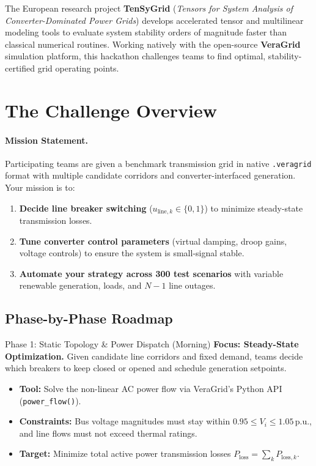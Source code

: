 \documentclass[11pt,a4paper]{article}
\begin{document}
The European research project \textbf{TenSyGrid} (\textit{Tensors for System Analysis of Converter-Dominated Power Grids}) develops accelerated tensor and multilinear modeling tools to evaluate system stability orders of magnitude faster than classical numerical routines. Working natively with the open-source \textbf{VeraGrid} simulation platform, this hackathon challenges teams to find optimal, stability-certified grid operating points.

\section{The Challenge Overview}

\paragraph{Mission Statement.}
Participating teams are given a benchmark transmission grid in native \texttt{.veragrid} format with multiple candidate corridors and converter-interfaced generation. Your mission is to:
\begin{enumerate}[leftmargin=*, itemsep=2pt]
  \item \textbf{Decide line breaker switching} ($u_{\text{line}, k} \in \{0, 1\}$) to minimize steady-state transmission losses.
  \item \textbf{Tune converter control parameters} (virtual damping, droop gains, voltage controls) to ensure the system is small-signal stable.
  \item \textbf{Automate your strategy across 300 test scenarios} with variable renewable generation, loads, and $N-1$ line outages.
\end{enumerate}

\subsection{Phase-by-Phase Roadmap}

\begin{challengebox}{Phase 1: Static Topology \& Power Dispatch (Morning)}
  \textbf{Focus: Steady-State Optimization.} Given candidate line corridors and fixed demand, teams decide which breakers to keep closed or opened and schedule generation setpoints.
  \begin{itemize}[leftmargin=*, itemsep=1pt]
    \item \textbf{Tool:} Solve the non-linear AC power flow via VeraGrid's Python API (\texttt{power\_flow()}).
    \item \textbf{Constraints:} Bus voltage magnitudes must stay within $0.95 \le V_i \le 1.05\,\text{p.u.}$, and line flows must not exceed thermal ratings.
    \item \textbf{Target:} Minimize total active power transmission losses $P_{\text{loss}} = \sum_{k} P_{\text{loss}, k}$.
  \end{itemize}
\end{challengebox}
\end{document}
